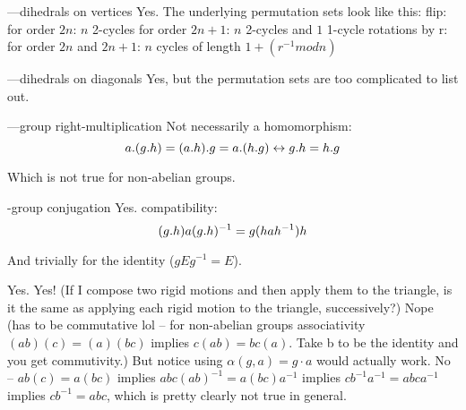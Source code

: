 \documentclass[1    0pt, answers]{exam} \renewcommand{\baselinestretch}{1.05}
\theoremstyle{plain}
\theoremstyle{definition}
\begin{document}
\begin{questions}

\begin{solution}
---dihedrals on vertices
Yes. The underlying permutation sets look like this:
flip:
for order $2n$: $n$ 2-cycles
for order $2n+1$: $n$ 2-cycles and $1$ 1-cycle
rotations by r:
for order $2n$ and $2n+1$: $n$ cycles of length $1 + (r^{-1} mod n)$

---dihedrals on diagonals
Yes, but the permutation sets are too complicated to list out.

---group right-multiplication
Not necessarily a homomorphism:
\[
a.(g.h)\\
= (a.h).g\\
= a.(h.g)\\
\leftrightarrow g.h = h.g
\]

Which is not true for non-abelian groups.

-group conjugation
Yes.
compatibility:
\[
(g.h) a (g.h)^{-1}\\
= g (h a h^{-1}) h
\]

And trivially for the identity ($g E g^{-1} = E$).
\end{solution}
\begin{solution}
Yes.
Yes! (If I compose two rigid motions and then apply them to the triangle, is it the same as applying each rigid motion to the triangle, successively?) 
Nope (has to be commutative lol -- for non-abelian groups associativity $(ab)(c) = (a)(bc)$ implies $c(ab) = bc(a)$. Take b to be the identity and you get commutivity.) But notice using $\alpha(g, a) = g \cdot a$ would actually work.
No -- $ab(c) = a(bc)$ implies $ab c (ab)^{-1} = a (bc) a^{-1}$ implies $c b^{-1} a^{-1} = a bc a^{-1}$ implies $c b^{-1} = abc$, which is pretty clearly not true in general.
\end{solution}


\end{questions}
\end{document}
